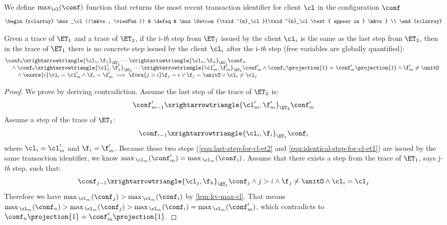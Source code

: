 We define \( \max_\cl(\conf) \) function that returns the most recent transaction identifier for client \( \cl \) in the configuration \( \conf \) 
\[
\begin{rclarray}
    \max_\cl((\mkvs, \viewFun)) & \defeq & \max\Setcon{\txid^{n}_\cl}{\txid^{n}_\cl \text{ appear in } \mkvs} \\
\end{rclarray}
\]

\begin{lemma}
\label{lem:different-cl}
Given a trace of \( \ET_1 \) and a trace of \( \ET_2 \),
if the i-\emph{th} step from \( \ET_1 \) issued by the client \( \cl_i \) 
is the same as the last step from \( \ET_2 \),
then in the trace of \( \ET_1 \) 
there is no concrete step issued by the client \(\cl_i \) after the i-\emph{th} step (free variables are globally quantified):
\[
\begin{array}{@{}l}
    \conf_0 \xrightarrowtriangle{\cl_1, \f_1}_{\ET_{1}} \cdots \xrightarrowtriangle{\cl_n, \f_n}_{\ET_{1}} \conf_n \\
    \quad {} \land \conf_0 \xrightarrowtriangle{\cl'_1, \f'_1}_{\ET_{2}} \cdots \xrightarrowtriangle{\cl'_m, \f'_m}_{\ET_{2}} \conf'_m 
    \land \conf_n\projection{1} = \conf'_m\projection{1} 
    \land \f'_m \neq \unitO \\
    \qquad {} \land \exsts{i}  
    \cl_i = \cl'_m
    \land \f_i = \f'_m 
    \implies \fora{j > i} 
    \f_j = \epsilon \lor \f_j = \unitO \lor \cl_i \neq \cl_j
\end{array}
\]
\end{lemma}
\begin{proof}
    We prove by deriving contradiction.
    Assume the last step of the trace of \( \ET_2 \) is:
    \begin{equation}
        \label{equ:last-step-for-cl-et2}
        \conf'_{m-1} \xrightarrowtriangle{\cl'_m, \f'_m}_{\ET_{2}} \conf'_m
    \end{equation}
    Assume a step of the trace of \( \ET_1 \):
    \begin{equation}
        \label{equ:identical-step-for-cl-et1}
        \conf_{i-1} \xrightarrowtriangle{\cl_i, \f_i}_{\ET_{1}} \conf_i
    \end{equation}
    where \( \cl_i = \cl'_m \) and \( \f_i = \f'_m \).
    Because these two steps (\cref{equ:last-step-for-cl-et2} and \cref{equ:identical-step-for-cl-et1}) are issued by the same transaction identifier,
    we know \( \max{}_{\cl_m}(\conf'_m) = \max{}_{\cl_m}(\conf_i) \).
    Assume that there exists a step from the trace of \( \ET_1 \), says j-\emph{th} step, such that:
    \[
        \conf_{j-1} \xrightarrowtriangle{\cl_j, \f_h}_{\ET_{1}} \conf_j \land j > i \land \f_j \neq \unitO \land \cl_i = \cl_j 
    \]
    Therefore we have \( \max{}_{\cl_m}(\conf_j) > \max{}_{\cl_m}(\conf_i) \) by \cref{lem:kv-max-cl}.
    That means \( \max{}_{\cl_m}(\conf_n) > \max{}_{\cl_m}(\conf_j) > \max{}_{\cl_m}(\conf_i) = \max{}_{\cl_m}(\conf'_m) \), which contradicts to \( \conf_n\projection{1} = \conf'_m\projection{1}\).
\end{proof}

